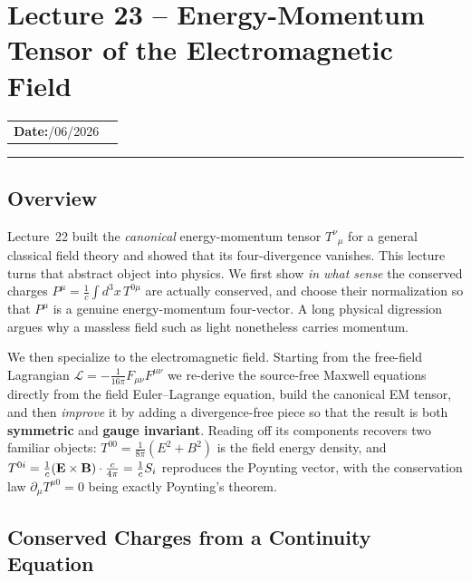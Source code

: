 \section{Lecture 23 -- Energy-Momentum Tensor of the Electromagnetic Field}\label{sec:lec23}

\begin{center}
\begin{tabular}{ll}
  \textbf{Date:}\quad 23/06/2026 & \\
\end{tabular}
\end{center}
\hrule\vspace{1.5em}

\subsection*{Overview}

Lecture~22 built the \emph{canonical} energy-momentum tensor $T^\nu{}_\mu$ for a general
classical field theory and showed that its four-divergence vanishes. This lecture turns
that abstract object into physics. We first show \emph{in what sense} the conserved
charges $P^\mu=\tfrac1c\int d^3x\,T^{0\mu}$ are actually conserved, and choose their
normalization so that $P^\mu$ is a genuine energy-momentum four-vector. A long physical
digression argues why a massless field such as light nonetheless carries momentum.

We then specialize to the electromagnetic field. Starting from the free-field Lagrangian
$\mathcal L=-\tfrac{1}{16\pi}F_{\mu\nu}F^{\mu\nu}$ we re-derive the source-free Maxwell
equations directly from the field Euler--Lagrange equation, build the canonical EM
tensor, and then \emph{improve} it by adding a divergence-free piece so that the result
is both \textbf{symmetric} and \textbf{gauge invariant}. Reading off its components
recovers two familiar objects: $T^{00}=\tfrac{1}{8\pi}(E^2+B^2)$ is the field energy
density, and $T^{0i}=\tfrac1c(\mathbf{E}\times\mathbf{B})\cdot\tfrac{c}{4\pi}=\tfrac1c S_i$ reproduces
the Poynting vector, with the conservation law $\partial_\mu T^{\mu0}=0$ being exactly
Poynting's theorem.

\subsection{Conserved Charges from a Continuity Equation}
\label{subsec:lec23:charges}

